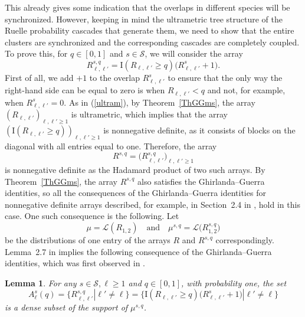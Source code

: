 \documentclass[aop,MSNbibl,dvips]{arximspdf}
\def\cal{\mathscr}
\newcommand{\spe}{{\cal S}}
\newcommand{\LL}{{\cal L}}
\newcommand{\Ind}{{\mathrm{I}}}
\newtheorem{lemma}{Lemma}
\begin{document}
This already gives some indication that the overlaps in different
species will be synchronized. However, keeping in mind the ultrametric
tree structure of the Ruelle probability cascades that generate them,
we need to show that the entire clusters are synchronized and the
corresponding cascades are completely coupled. To prove this, for $q\in
[0,1]$ and $s\in\spe$, we will consider the array
%
\begin{equation}
R^{s,q}_{\ell,\ell'} = \Ind(R_{\ell,\ell'}\geq q)
\bigl(R^s_{\ell,\ell
'} +1\bigr).
\end{equation}
%
First of all, we add $+1$ to the overlap $R^s_{\ell,\ell'}$ to ensure
that the only way the right-hand side can be equal to zero is when
$R_{\ell,\ell'}< q$ and not, for example, when $R^s_{\ell,\ell
'}=0$. As
in (\ref{ultram}), by Theorem~\ref{ThGGms}, the array $(R_{\ell,\ell
'})_{\ell,\ell'\geq1}$ is ultrametric, which implies that the array
$(\Ind(R_{\ell,\ell'}\geq q))_{\ell,\ell'\geq1}$ is nonnegative
definite, as it consists of blocks on the diagonal with all entries
equal to one. Therefore, the array
%
\[
R^{s,q} = \bigl(R^{s,q}_{\ell,\ell'} \bigr)_{\ell,\ell'\geq1}
\]
%
is nonnegative definite as the Hadamard product of two such arrays. By
Theorem~\ref{ThGGms}, the array $R^{s,q}$ also satisfies the
Ghirlanda--Guerra identities, so all the consequences of the
Ghirlanda--Guerra identities for nonnegative definite arrays described,
for example, in Section~2.4 in \cite{SKmodel}, hold in this case. One
such consequence is the following. Let
%
\begin{equation}
\mu= \LL(R_{1,2}) \quad\mbox{and}\quad \mu^{s,q} = \LL
\bigl(R^{s,q}_{1,2}\bigr)
\end{equation}
%
be the distributions of one entry of the arrays $R$ and $R^{s,q}$
correspondingly. Lemma~2.7 in \cite{SKmodel} implies the following
consequence of the Ghirlanda--Guerra identities, which was first
observed in \cite{PT}.

\begin{lemma}\label{LemDense}
For any $s\in\spe, \ell\geq1$ and $q\in[0,1]$, with probability one,
the set
%
\begin{equation}
A^{s}_\ell(q) = \bigl\{R^{s,q}_{\ell,\ell'} |
\ell'\neq\ell \bigr\} = \bigl\{ \Ind(R_{\ell,\ell'}\geq q)
\bigl(R^s_{\ell,\ell'} +1\bigr) | \ell '\neq\ell \bigr
\} \label{Asq}
\end{equation}
%
is a dense subset of the support of $\mu^{s,q}$.
\end{lemma}
\end{document}
